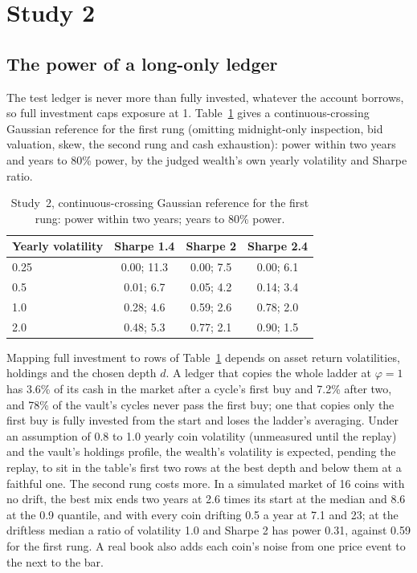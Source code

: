 \documentclass[11pt]{article}
\begin{document}
\section{Study 2}\label{app:study2}

\subsection{The power of a long-only ledger}\label{app:longonly}

The test ledger is never more than fully invested, whatever the account borrows, so full investment caps exposure at 1. Table~\ref{tab:longonly} gives a continuous-crossing Gaussian reference for the first rung (omitting midnight-only inspection, bid valuation, skew, the second rung and cash exhaustion): power within two years and years to 80\% power, by the judged wealth's own yearly volatility and Sharpe ratio.

\begin{table}[ht]
\centering
\small
\begin{tabular}{@{}lccc@{}}
\toprule
Yearly volatility & Sharpe 1.4 & Sharpe 2 & Sharpe 2.4 \\
\midrule
0.25 & 0.00; 11.3 & 0.00; 7.5 & 0.00; 6.1 \\
0.5 & 0.01; 6.7 & 0.05; 4.2 & 0.14; 3.4 \\
1.0 & 0.28; 4.6 & 0.59; 2.6 & 0.78; 2.0 \\
2.0 & 0.48; 5.3 & 0.77; 2.1 & 0.90; 1.5 \\
\bottomrule
\end{tabular}
\caption{Study~2, continuous-crossing Gaussian reference for the first rung: power within two years; years to 80\% power.}
\label{tab:longonly}
\end{table}

Mapping full investment to rows of Table~\ref{tab:longonly} depends on asset return volatilities, holdings and the chosen depth $d$. A ledger that copies the whole ladder at $\varphi=1$ has 3.6\% of its cash in the market after a cycle's first buy and 7.2\% after two, and 78\% of the vault's cycles never pass the first buy; one that copies only the first buy is fully invested from the start and loses the ladder's averaging. Under an assumption of 0.8 to 1.0 yearly coin volatility (unmeasured until the replay) and the vault's holdings profile, the wealth's volatility is expected, pending the replay, to sit in the table's first two rows at the best depth and below them at a faithful one. The second rung costs more. In a simulated market of 16 coins with no drift, the best mix ends two years at 2.6 times its start at the median and 8.6 at the 0.9 quantile, and with every coin drifting 0.5 a year at 7.1 and 23; at the driftless median a ratio of volatility 1.0 and Sharpe 2 has power 0.31, against 0.59 for the first rung. A real book also adds each coin's noise from one price event to the next to the bar.
\end{document}
